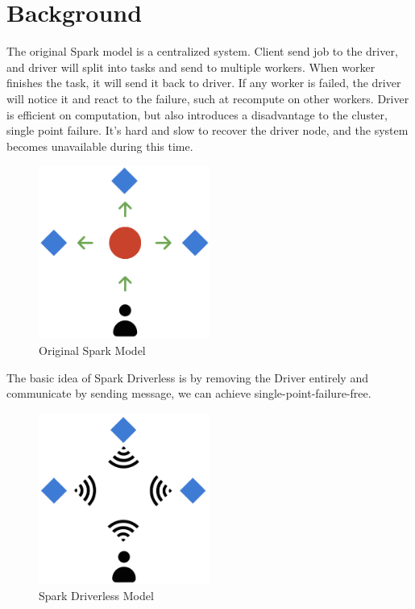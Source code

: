 
\section{Background} %
\label{sec:background}

The original Spark model is a centralized system.
Client send job to the driver, and driver will split into tasks and send to multiple workers.
When worker finishes the task, it will send it back to driver.
If any worker is failed, the driver will notice it and react to the failure, such at recompute on other workers.
Driver is efficient on computation, but also introduces a disadvantage to the cluster, single point failure.
It's hard and slow to recover the driver node, and the system becomes unavailable during this time.

\begin{figure}[htb]
    \centering
    \includegraphics[width=0.5\textwidth]{images/original_model.png}
    \caption{Original Spark Model}\label{fig:original_model}
\end{figure}

The basic idea of Spark Driverless is by removing the Driver entirely and communicate by sending message,
we can achieve single-point-failure-free.

\begin{figure}[htb]
    \centering
    \includegraphics[width=0.5\textwidth]{images/new_model.png}
    \caption{Spark Driverless Model}\label{fig:new_model}
\end{figure}

